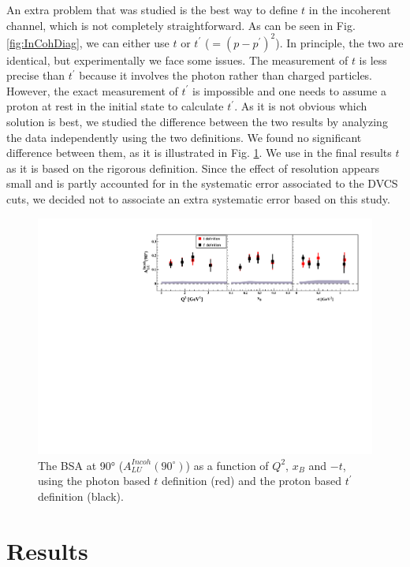\documentclass{article}
\begin{document}
An extra problem that was studied is the best way to define $t$ in the incoherent channel, 
which is not completely straightforward. As can be seen in Fig. \ref{fig:InCohDiag}, 
we can either use $t$ or $t^\prime$ ($= (p - p^\prime)^2$). In principle, the two are 
identical, but experimentally we face some issues. The measurement of $t$ is less precise than
$t^\prime$ because it involves the photon rather than charged particles. However, the 
exact measurement of $t^\prime$ is impossible and one needs to assume a proton at rest
in the initial state to calculate $t^\prime$. As it is not obvious which solution is best,
we studied the difference between the two results by analyzing the data independently using the two 
definitions. We found no significant difference between them, as it is 
illustrated in Fig. \ref{fig:ttpComp}. We use in the final results $t$ as it is based on the 
rigorous definition. Since the effect of resolution appears small and is partly accounted for
in the systematic error associated to the DVCS cuts, we decided not to associate an extra
systematic error based on this study.

\begin{figure}[tbp!]
\center
\includegraphics[width=15cm]{fig3/t_tprime_ALU_90_p_shortscenrario.pdf}
	\caption{The BSA at 90° ($A_{LU}^{Incoh} (90^\circ)$) as a
	function of $Q^2$, $x_{B}$ and $-t$, using the photon based $t$ definition (red)
	and the proton based $t^\prime$ definition (black).}
\label{fig:ttpComp}
\end{figure}

\section{Results}
\end{document}
